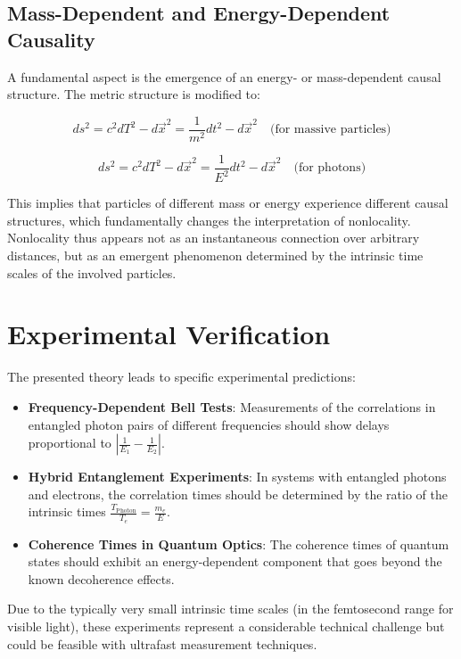 \documentclass[a4paper,12pt]{article}
\begin{document}
	\subsection{Mass-Dependent and Energy-Dependent Causality}
	A fundamental aspect is the emergence of an energy- or mass-dependent causal structure. The metric structure is modified to:
	
	\begin{equation}
		ds^2 = c^2dT^2 - d\vec{x}^2 = \frac{1}{m^2}dt^2 - d\vec{x}^2 \quad \text{(for massive particles)}
	\end{equation}
	
	\begin{equation}
		ds^2 = c^2dT^2 - d\vec{x}^2 = \frac{1}{E^2}dt^2 - d\vec{x}^2 \quad \text{(for photons)}
	\end{equation}
	
	This implies that particles of different mass or energy experience different causal structures, which fundamentally changes the interpretation of nonlocality. Nonlocality thus appears not as an instantaneous connection over arbitrary distances, but as an emergent phenomenon determined by the intrinsic time scales of the involved particles.
	
	\section{Experimental Verification}
	The presented theory leads to specific experimental predictions:
	
	\begin{itemize}
		\item \textbf{Frequency-Dependent Bell Tests}: Measurements of the correlations in entangled photon pairs of different frequencies should show delays proportional to $\left|\frac{1}{E_1} - \frac{1}{E_2}\right|$.
		
		\item \textbf{Hybrid Entanglement Experiments}: In systems with entangled photons and electrons, the correlation times should be determined by the ratio of the intrinsic times $\frac{T_{\text{Photon}}}{T_e} = \frac{m_e}{E}$.
		
		\item \textbf{Coherence Times in Quantum Optics}: The coherence times of quantum states should exhibit an energy-dependent component that goes beyond the known decoherence effects.
	\end{itemize}
	
	Due to the typically very small intrinsic time scales (in the femtosecond range for visible light), these experiments represent a considerable technical challenge but could be feasible with ultrafast measurement techniques.
	
\end{document}
